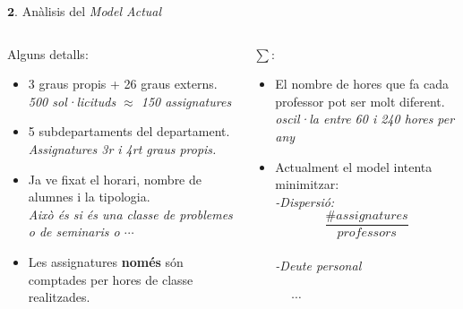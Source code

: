 \documentclass[twocolumn]{beamer}
\begin{document}
\begin{frame}{$\mathbf 2.$ Anàlisis del \textit{Model Actual}}
\begin{columns}[t]
	\begin{column}{.5\textwidth}
		\begin{block}{Alguns detalls:}
			\begin{itemize}
				\footnotesize
				\item 3 graus propis + 26 graus externs. \\ \textit{\footnotesize \color{blue} 500 sol·licituds $\approx$ 150 assignatures}
				\item 5 subdepartaments del departament. \\ \textit{ \footnotesize \color{blue} Assignatures 3r i 4rt graus propis.}
				\item  Ja ve fixat el horari, nombre de alumnes i la tipologia. \\ \textit{\footnotesize \color{blue} Això és si és una classe de problemes o de seminaris o $\cdots$}
				\item Les assignatures \textbf{només} són comptades per hores de classe realitzades.
			\end{itemize}
		\end{block}
	\end{column}
	\begin{column}{.5\textwidth}
		
		\begin{block}{\Large$\sum:   $}
			\begin{itemize}
			\footnotesize
			\item El nombre de hores que fa cada professor pot ser molt diferent. \\ \textit{\footnotesize \color{blue} oscil·la entre 60 i 240 hores per any}
			\item Actualment el model intenta minimitzar:
			\textit{\footnotesize \color{blue}
				\\-Dispersió:$$\frac{\# assignatures}{professors}$$
				\\-Deute personal}
		     \end{itemize}
		\end{block}
	
		\Huge$\quad  \quad  \quad \cdots$ 
		
	    \end{column}
\end{columns}
\end{frame}
\end{document}
